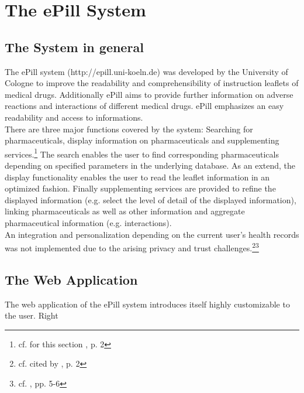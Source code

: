 \section{The ePill System}

\subsection{The System in general}
The ePill system (http://epill.uni-koeln.de) was developed by the University of Cologne to improve the readability and comprehensibility of instruction leaflets of medical drugs. Additionally ePill aims to provide further information on adverse reactions and interactions of different medical drugs. ePill emphasizes an easy readability and access to informations.
\\
There are three major functions covered by the system: Searching for pharmaceuticals, display information on pharmaceuticals and supplementing services.\footnote{cf. for this section \cite{Dehling.2012}, p. 2} The search enables the user to find corresponding pharmaceuticals depending on specified parameters in the underlying database. As an extend, the display functionality enables the user to read the leaflet information in an optimized fashion. Finally supplementing services are provided to refine the displayed information (e.g. select the level of detail of the displayed information), linking pharmaceuticals as well as other information and aggregate pharmaceutical information (e.g. interactions).
\\
An integration and personalization depending on the current user's health records was not implemented due to the arising privacy and trust challenges.\footnote{cf. \cite{Kaletsch.2011} cited by \cite{Dehling.2012}, p. 2}\footnote{cf. \cite{Kaletsch.2011}, pp. 5-6}

\subsection{The Web Application}
The web application of the ePill system introduces itself highly customizable to the user. Right 